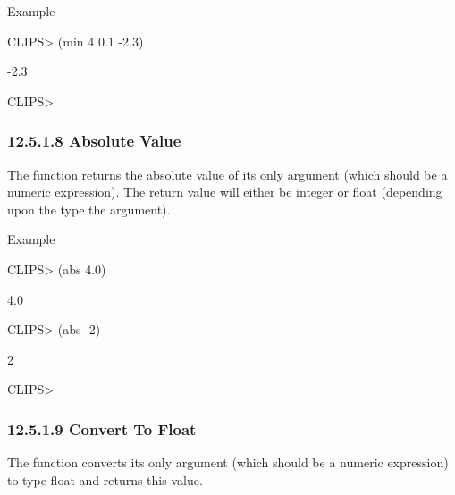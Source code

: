 \documentclass[letterpaper,10pt,english]{sphinxmanual}
\begin{document}

\begin{sphinxVerbatim}[commandchars=\\\{\}]
 
\end{sphinxVerbatim}

Example

CLIPS\textgreater{} (min 4 0.1 -2.3)

-2.3

CLIPS\textgreater{}


\subsubsection{12.5.1.8 Absolute Value}
\label{\detokenize{actions:absolute-value}}
The  function returns the absolute value of its only argument
(which should be a numeric expression). The return value will either be
integer or float (depending upon the type the argument).


\begin{sphinxVerbatim}[commandchars=\\\{\}]
 
\end{sphinxVerbatim}

Example

CLIPS\textgreater{} (abs 4.0)

4.0

CLIPS\textgreater{} (abs -2)

2

CLIPS\textgreater{}


\subsubsection{12.5.1.9 Convert To Float}
\label{\detokenize{actions:convert-to-float}}
The  function converts its only argument (which should be a
numeric expression) to type float and returns this value.


\begin{sphinxVerbatim}[commandchars=\\\{\}]
 
\end{sphinxVerbatim}
\end{document}

